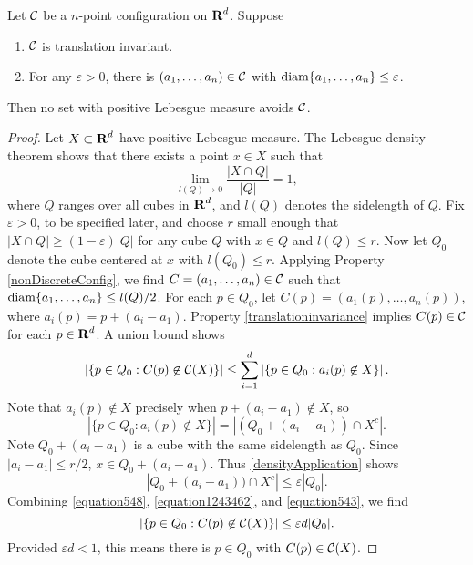 \begin{theorem}
	Let $\operatorname{\mathcal{C}}$ be a $n$-point configuration on $\operatorname{\mathbf{R}}^d$. Suppose
	\begin{enumerate}
		\item \label{translationinvariance} $\operatorname{\mathcal{C}}$ is translation invariant.
		\item \label{nonDiscreteConfig} For any $\varepsilon > 0$, there is $(a_1, \dots, a_n) \in \operatorname{\mathcal{C}}$ with $\operatorname{\text{diam}} \{ a_1, \dots, a_n \} \leq \varepsilon$.
	\end{enumerate}
	Then no set with positive Lebesgue measure avoids $\operatorname{\mathcal{C}}$.
\end{theorem}
\begin{proof}
	Let $X \subset \operatorname{\mathbf{R}}^d$ have positive Lebesgue measure. The Lebesgue density theorem shows that there exists a point $x \in X$ such that
	\begin{equation} \label{densityApplication} \lim_{l(Q) \to 0} \frac{|X \cap Q|}{|Q|} = 1, \end{equation}
	where $Q$ ranges over all cubes in $\operatorname{\mathbf{R}}^d$, and $l(Q)$ denotes the sidelength of $Q$. Fix $\varepsilon > 0$, to be specified later, and choose $r$ small enough that $|X \cap Q| \geq (1 - \varepsilon) |Q|$ for any cube $Q$ with $x \in Q$ and $l(Q) \leq r$. Now let $Q_0$ denote the cube centered at $x$ with $l(Q_0) \leq r$. Applying Property \ref{nonDiscreteConfig}, we find $C = (a_1, \dots, a_n) \in \operatorname{\mathcal{C}}$ such that $\operatorname{\text{diam}} \{ a_1, \dots, a_n \} \leq l(Q)/2$. For each $p \in Q_0$, let $C(p) = (a_1(p), \dots, a_n(p))$, where $a_i(p) = p + (a_i - a_1)$. Property \ref{translationinvariance} implies $C(p) \in \operatorname{\mathcal{C}}$ for each $p \in \operatorname{\mathbf{R}}^d$. A union bound shows
	\begin{equation} \label{equation548} \left| \{ p \in Q_0 : C(p) \not \in \operatorname{\mathcal{C}}(X) \} \right| \leq \sum_{i = 1}^d \left| \{ p \in Q_0 : a_i(p) \not \in X \} \right|.
	\end{equation}
	Note that $a_i(p) \not \in X$ precisely when $p + (a_i - a_1) \not \in X$, so
	\begin{equation} \label{equation1243462}
		|\{ p \in Q_0 : a_i(p) \not \in X \}| = |(Q_0 + (a_i - a_1)) \cap X^c|.
	\end{equation}
	Note $Q_0 + (a_i - a_1)$ is a cube with the same sidelength as $Q_0$. Since $|a_i - a_1| \leq r/2$, $x \in Q_0 + (a_i - a_1)$. Thus \eqref{densityApplication} shows
	\begin{equation} \label{equation543} |Q_0 + (a_i - a_1)) \cap X^c| \leq \varepsilon |Q_0|. \end{equation}
	Combining \eqref{equation548}, \eqref{equation1243462}, and \eqref{equation543}, we find
	\[ \left| \{ p \in Q_0 : C(p) \not \in \operatorname{\mathcal{C}}(X) \} \right| \leq \varepsilon d |Q_0|. \]
	Provided $\varepsilon d < 1$, this means there is $p \in Q_0$ with $C(p) \in \operatorname{\mathcal{C}}(X)$.
\end{proof}

